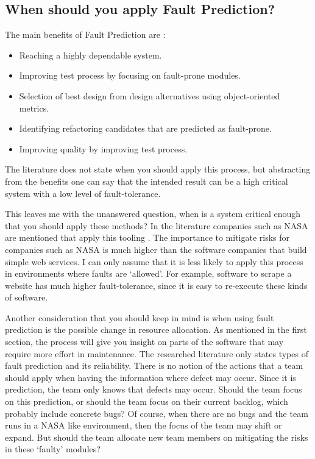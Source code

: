 \subsection*{When should you apply Fault Prediction?}

The main benefits of Fault Prediction are \autocite[4626]{Catal20114626}:

\begin{itemize}
\setlength\itemsep{0em}
\item Reaching a highly dependable system.
\item Improving test process by focusing on fault-prone modules.
\item Selection of best design from design alternatives using object-oriented metrics.
\item Identifying refactoring candidates that are predicted as fault-prone.
\item Improving quality by improving test process.
\end{itemize}

The literature does not state when you should apply this process,
but abstracting from the benefits one can say that the intended result can be a high critical system with a low level of fault-tolerance.

This leaves me with the unanswered question, when is a system critical enough that you should apply these methods?
In the literature companies such as NASA are mentioned that apply this tooling \autocite[4626]{Catal20114626} \autocite[7347]{Catal20097346}.
The importance to mitigate risks for companies such as NASA is much higher than the software companies that build simple web services.
I can only assume that it is less likely to apply this process in environments where faults are `allowed'.
For example, software to scrape a website has much higher fault-tolerance, since it is easy to re-execute these kinds of software.

Another consideration that you should keep in mind is when using fault prediction is the possible change in resource allocation.
As mentioned in the first section, the process will give you insight on parts of the software that may require more effort in maintenance.
The researched literature only states types of fault prediction and its reliability.
There is no notion of the actions that a team should apply when having the information where defect may occur.
Since it is prediction, the team only knows that defects may occur.
Should the team focus on this prediction, or should the team focus on their current backlog, which probably include concrete bugs?
Of course, when there are no bugs and the team runs in a NASA like environment, then the focus of the team may shift or expand.
But should the team allocate new team members on mitigating the risks in these `faulty' modules?

